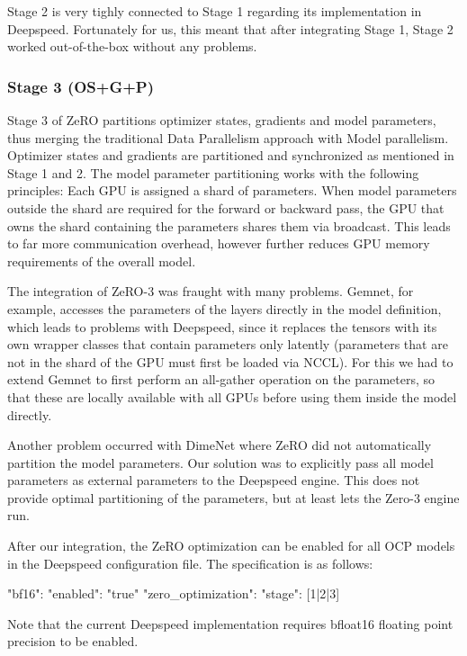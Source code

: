 Stage 2 is very tighly connected to Stage 1 regarding its implementation in Deepspeed. Fortunately 
for us, this meant that after integrating Stage 1, Stage 2 worked out-of-the-box without any problems.

\subsubsection{Stage 3 (OS+G+P)}

Stage 3 of ZeRO partitions optimizer states, gradients and model parameters, thus merging the 
traditional Data Parallelism approach with Model parallelism. Optimizer states and gradients 
are partitioned and synchronized as mentioned in Stage 1 and 2. The model parameter partitioning 
works with the following principles: Each GPU is assigned a shard of parameters. When model 
parameters outside the shard are required for the forward or backward pass, the GPU that owns 
the shard containing the parameters shares them via broadcast. This leads to far more communication 
overhead, however further reduces GPU memory requirements of the overall model.

The integration of ZeRO-3 was fraught with many problems. Gemnet, for example, accesses the 
parameters of the layers directly in the model definition, which leads to problems with 
Deepspeed, since it replaces the tensors with its own wrapper classes that contain parameters 
only latently (parameters that are not in the shard of the GPU must first be loaded via NCCL). 
For this we had to extend Gemnet to first perform an all-gather operation on the parameters, 
so that these are locally available with all GPUs before using them inside the model directly.

Another problem occurred with DimeNet where ZeRO did not automatically partition the model 
parameters. Our solution was to explicitly pass all model parameters as external parameters 
to the Deepspeed engine. This does not provide optimal partitioning of the parameters, but 
at least lets the Zero-3 engine run.

After our integration, the ZeRO optimization can be enabled for all OCP models in the Deepspeed configuration 
file. The specification is as follows:

\begin{json}
"bf16": {
    "enabled": "true"
}
"zero_optimization": {
    "stage": [1|2|3]
}
\end{json}

Note that the current Deepspeed implementation requires bfloat16 floating point precision to be enabled. 
